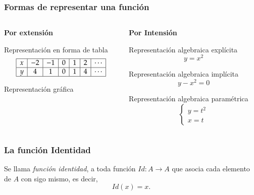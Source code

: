 \begin{frame}
\frametitle{Formas de representar una función}
\begin{columns}
\begin{column}{.48\textwidth}
\textbf{Por extensión}
\begin{block}{Representación en forma de tabla}
\[
\begin{array}{|c|c|c|c|c|c|c|}
\hline
 x & -2 & -1 & 0 & 1 & 2 & \cdots \\
\hline
 y & 4  & 1  & 0 & 1 & 4 & \cdots \\
\hline
\end{array}
\]
\end{block}
\begin{block}{Representación gráfica}
\begin{center}
\scalebox{1}{}
\end{center}
\end{block}
\end{column}
\begin{column}{.48\textwidth}
\textbf{Por Intensión}
\begin{block}{Representación algebraica explícita}
\[y=x^2\]
\end{block}
\begin{block}{Representación algebraica implícita}
\[y-x^2=0\]
\end{block}
\begin{block}{Representación algebraica paramétrica}
\[  
\begin{cases}
y=t^2\\
x=t
\end{cases}
\]
\end{block}
\end{column}   
\end{columns}
\end{frame} 


\begin{frame}
\frametitle{La función Identidad}
\begin{definicion}
Se llama \emph{función identidad}, a toda función $Id: A\rightarrow A$ que asocia cada elemento de $A$ con sigo mismo, es decir, 
\[Id(x)=x.\]
\end{definicion}
\begin{center}
\scalebox{1}{}
\end{center}
\end{frame} 



